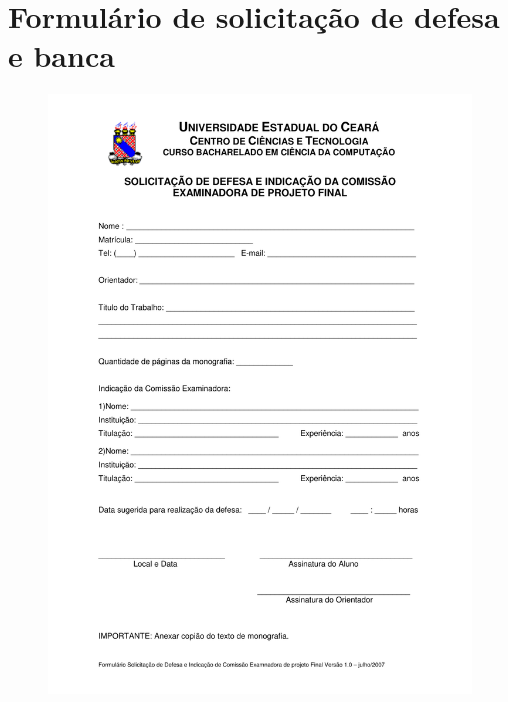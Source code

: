 \clearpage
\section{Formulário de solicitação de defesa e banca}
\label{anx:defesa}
\begin{figure}[htbp]
\centering
\includegraphics[scale=0.6]{requisitos/Formulario_Solicitacao_Defesa_e_Banca_v1.pdf}
\end{figure}

